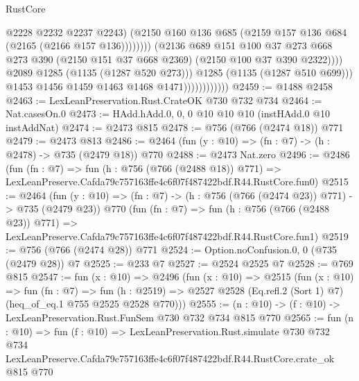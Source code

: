\begin{lexlean}{RustCore}
\begin{coremodule}
                                              @2228
                                              @2232
                                              @2237
                                              @2243)
                                            (@2150
                                              @160
                                              @136
                                              @685
                                              (@2159 @157 @136 @684 (@2165 (@2166 @157 @136))))))))
                                    (@2136
                                      @689
                                      @151
                                      @100
                                      @37
                                      @273
                                      @668
                                      @273
                                      @390
                                      (@2150 @151 @37 @668 @2369)
                                      (@2150 @100 @37 @390 @2322))))
                                @2089
                                @1285
                                (@1135 (@1287 @520 @273)))
                              @1285
                              (@1135 (@1287 @510 @699)))
                            @1453
                            @1456
                            @1459
                            @1463
                            @1468
                            @1471))))))))))))
@2459 := @1488 @2458
@2463 := LexLeanPreservation.Rust.CrateOK @730 @732 @734
@2464 := Nat.casesOn.{0}
@2473 := HAdd.hAdd.{0, 0, 0} @10 @10 @10 (instHAdd.{0} @10 instAddNat)
@2474 := @2473 @815
@2478 := @756 (@766 (@2474 @18)) @771
@2479 := @2473 @813
@2486 := @2464 (fun (y : @10) => (fn : @7) -> (h : @2478) -> @735 (@2479 @18)) @770
@2488 := @2473 Nat.zero
@2496 := @2486
    (fun (fn : @7) =>
    fun (h : @756 (@766 (@2488 @18)) @771) =>
    LexLeanPreserve.Cafda79c757163ffe4c6f07f487422bdf.R44.RustCore.fun0)
@2515 := @2464
    (fun (y : @10) => (fn : @7) -> (h : @756 (@766 (@2474 @23)) @771) -> @735 (@2479 @23))
    @770
    (fun (fn : @7) =>
    fun (h : @756 (@766 (@2488 @23)) @771) =>
    LexLeanPreserve.Cafda79c757163ffe4c6f07f487422bdf.R44.RustCore.fun1)
@2519 := @756 (@766 (@2474 @28)) @771
@2524 := Option.noConfusion.{0, 0} (@735 (@2479 @28)) @7
@2525 := @233 @7
@2527 := @2524 @2525 @7
@2528 := @769 @815
@2547 := fun (x : @10) =>
  @2496
    (fun (x : @10) =>
    @2515
      (fun (x : @10) =>
      fun (fn : @7) =>
      fun (h : @2519) =>
      @2527 @2528 (Eq.refl.{2} (Sort 1) @7) (heq_of_eq.{1} @755 @2525 @2528 @770)))
@2555 := (n : @10) -> (f : @10) -> LexLeanPreservation.Rust.FunSem @730 @732 @734 @815 @770
@2565 := fun (n : @10) =>
  fun (f : @10) =>
  LexLeanPreservation.Rust.simulate
    @730
    @732
    @734
    LexLeanPreserve.Cafda79c757163ffe4c6f07f487422bdf.R44.RustCore.crate_ok
    @815
    @770
\end{coremodule}
\end{lexlean}
